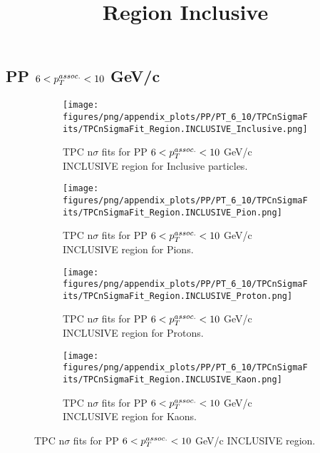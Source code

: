     
            \subsection{PP $6 < \pTassoc < 10$ GeV/c}
            \begin{figure}[H]
                \title{Region Inclusive}
                \begin{subfigure}[b]{0.5\textwidth}
                    \centering
                    \texttt{[image: figures/png/appendix\_plots/PP/PT\_6\_10/TPCnSigmaFits/TPCnSigmaFit\_Region.INCLUSIVE\_Inclusive.png]}
                    \caption{TPC n$\sigma$ fits for PP $6 < \pTassoc < 10$ GeV/c INCLUSIVE region for Inclusive particles.}
                    \label{fig:appendix_PP_$6 < \pTassoc < 10$ GeV/c_INCLUSIVE_Inclusive}
                \end{subfigure}
                \begin{subfigure}[b]{0.5\textwidth}
                    \centering
                    \texttt{[image: figures/png/appendix\_plots/PP/PT\_6\_10/TPCnSigmaFits/TPCnSigmaFit\_Region.INCLUSIVE\_Pion.png]}
                    \caption{TPC n$\sigma$ fits for PP $6 < \pTassoc < 10$ GeV/c INCLUSIVE region for Pions.}
                    \label{fig:appendix_PP_$6 < \pTassoc < 10$ GeV/c_INCLUSIVE_Pion}
                \end{subfigure}
                \begin{subfigure}[b]{0.5\textwidth}
                    \centering
                    \texttt{[image: figures/png/appendix\_plots/PP/PT\_6\_10/TPCnSigmaFits/TPCnSigmaFit\_Region.INCLUSIVE\_Proton.png]}
                    \caption{TPC n$\sigma$ fits for PP $6 < \pTassoc < 10$ GeV/c INCLUSIVE region for Protons.}
                    \label{fig:appendix_PP_$6 < \pTassoc < 10$ GeV/c_INCLUSIVE_Proton}
                \end{subfigure}
                \begin{subfigure}[b]{0.5\textwidth}
                    \centering
                    \texttt{[image: figures/png/appendix\_plots/PP/PT\_6\_10/TPCnSigmaFits/TPCnSigmaFit\_Region.INCLUSIVE\_Kaon.png]}
                    \caption{TPC n$\sigma$ fits for PP $6 < \pTassoc < 10$ GeV/c INCLUSIVE region for Kaons.}
                    \label{fig:appendix_PP_$6 < \pTassoc < 10$ GeV/c_INCLUSIVE_Kaon}
                \end{subfigure}
                \caption{TPC n$\sigma$ fits for PP $6 < \pTassoc < 10$ GeV/c INCLUSIVE region.}
                \label{fig:appendix_PP_$6 < \pTassoc < 10$ GeV/c_INCLUSIVE}
            \end{figure}
